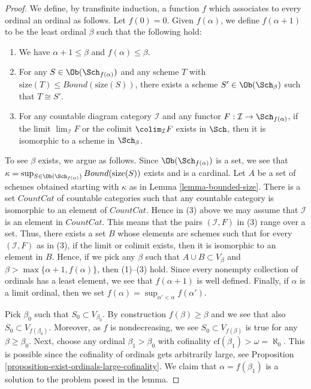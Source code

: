 \begin{proof}
We define, by transfinite induction, a function $f$ which associates
to every ordinal an ordinal as follows. Let $f(0) = 0$.
Given $f(\alpha)$, we define $f(\alpha + 1)$ to be the least
ordinal $\beta$ such that the following hold:
\begin{enumerate}
\item We have $\alpha + 1 \leq \beta$ and $f(\alpha) \leq \beta$.
\item For any $S \in \Ob(\Sch_{f(\alpha)})$ and any
scheme $T$ with $\text{size}(T) \leq Bound(\text{size}(S))$,
there exists a scheme $S' \in \Ob(\Sch_\beta)$
such that $T \cong S'$.
\item For any countable diagram category $\mathcal{I}$ and
any functor $F : \mathcal{I} \to \Sch_{f(\alpha)}$, if
the limit $\lim_\mathcal{I} F$ or the colimit
$\colim_\mathcal{I} F$ exists in $\Sch$,
then it is isomorphic to a scheme in $\Sch_\beta$.
\end{enumerate}
To see $\beta$ exists, we argue as follows. Since
$\Ob(\Sch_{f(\alpha)})$ is a set, we see that
$\kappa =
\sup_{S \in \Ob(\Sch_{f(\alpha)})} Bound(\text{size}(S))$
exists and is a cardinal.
Let $A$ be a set of schemes obtained starting with $\kappa$
as in Lemma \ref{lemma-bounded-size}.
There is a set $CountCat$ of countable
categories such that any countable category is isomorphic to
an element of $CountCat$. Hence in (3) above we may assume
that $\mathcal{I}$ is an element in $CountCat$. This means that
the pairs $(\mathcal{I}, F)$ in (3) range over a set.
Thus, there exists a set $B$ whose elements are schemes
such that for every $(\mathcal{I}, F)$ as in (3), if the
limit or colimit exists, then it is isomorphic to an element in $B$.
Hence, if we pick any $\beta$ such that $A \cup B \subset V_\beta$
and $\beta > \max\{\alpha + 1, f(\alpha)\}$, then (1)--(3) hold.
Since every nonempty collection of ordinals has a least element,
we see that $f(\alpha + 1)$ is well defined. Finally, if $\alpha$
is a limit ordinal, then we set
$f(\alpha) = \sup_{\alpha' < \alpha} f(\alpha')$.

\medskip\noindent
Pick $\beta_0$ such that $S_0 \subset V_{\beta_0}$.
By construction $f(\beta) \geq \beta$ and we see that
also $S_0 \subset V_{f(\beta_0)}$. Moreover, as $f$ is
nondecreasing, we see $S_0 \subset V_{f(\beta)}$ is true for any
$\beta \geq \beta_0$.
Next, choose any ordinal $\beta_1 > \beta_0$ with cofinality
$\text{cf}(\beta_1) > \omega = \aleph_0$. This is possible
since the cofinality of ordinals gets arbitrarily large, see
Proposition \ref{proposition-exist-ordinals-large-cofinality}.
We claim that
$\alpha = f(\beta_1)$ is a solution to the problem posed in the lemma.


\end{proof}
